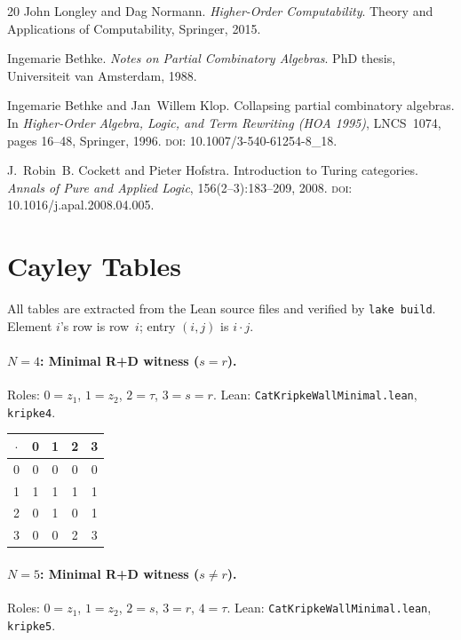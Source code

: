 \documentclass[sigconf,screen]{acmart}
\newcommand{\dotop}{\cdot}
\theoremstyle{remark}
\begin{document}
\begin{thebibliography}{20}
John Longley and Dag Normann.
\newblock \emph{Higher-Order Computability}.
\newblock Theory and Applications of Computability, Springer, 2015.

Ingemarie Bethke.
\newblock \emph{Notes on Partial Combinatory Algebras}.
\newblock PhD thesis, Universiteit van Amsterdam, 1988.

Ingemarie Bethke and Jan~Willem Klop.
\newblock Collapsing partial combinatory algebras.
\newblock In \emph{Higher-Order Algebra, Logic, and Term Rewriting (HOA 1995)}, LNCS~1074, pages 16--48, Springer, 1996. \textsc{doi}: 10.1007/3-540-61254-8\_18.

J.~Robin~B. Cockett and Pieter Hofstra.
\newblock Introduction to {T}uring categories.
\newblock \emph{Annals of Pure and Applied Logic}, 156(2--3):183--209, 2008. \textsc{doi}: 10.1016/j.apal.2008.04.005.

\end{thebibliography}

\appendix

\section{Cayley Tables}
\label{app:tables}

All tables are extracted from the Lean source files and verified by \texttt{lake build}. Element $i$'s row is row~$i$; entry $(i,j)$ is $i \dotop j$.

\paragraph{$N\!=\!4$: Minimal R+D witness ($s = r$).}
Roles: $0 = z_1$, $1 = z_2$, $2 = \tau$, $3 = s = r$. \quad Lean: \texttt{CatKripkeWallMinimal.lean}, \texttt{kripke4}.

\medskip
{\small
\begin{tabular}{c|cccc}
$\dotop$ & 0 & 1 & 2 & 3 \\\hline
0 & 0 & 0 & 0 & 0 \\
1 & 1 & 1 & 1 & 1 \\
2 & 0 & 1 & 0 & 1 \\
3 & 0 & 0 & 2 & 3 \\
\end{tabular}}

\paragraph{$N\!=\!5$: Minimal R+D witness ($s \neq r$).}
Roles: $0 = z_1$, $1 = z_2$, $2 = s$, $3 = r$, $4 = \tau$. \quad Lean: \texttt{CatKripkeWallMinimal.lean}, \texttt{kripke5}.
\end{document}
